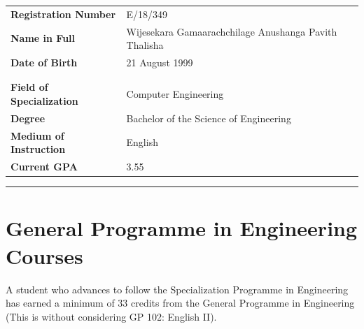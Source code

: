 \documentclass[12pt]{article}
\begin{document}
\begin{table}[H]
\begin{tabularx}{\textwidth}{Xl}
\textbf{Registration Number} & E/18/349 \\
\textbf{Name in Full} & Wijesekara Gamaarachchilage Anushanga Pavith Thalisha \\
\textbf{Date of Birth} & 21 August 1999 \\
\\
\\

\textbf{Field of Specialization} & Computer Engineering \\
\textbf{Degree} & Bachelor of the Science of Engineering \\
\textbf{Medium of Instruction} & English \\
\textbf{Current GPA} & 3.55 \\
\end{tabularx}
\end{table}

\vspace{-15pt}

\noindent\rule{\textwidth}{1pt}

\vspace{-20pt}

\section*{General Programme in Engineering Courses}

A student who advances to follow the Specialization Programme in Engineering has earned a minimum of 33 credits from the General Programme in Engineering (This is without considering GP 102: English II).
\end{document}
